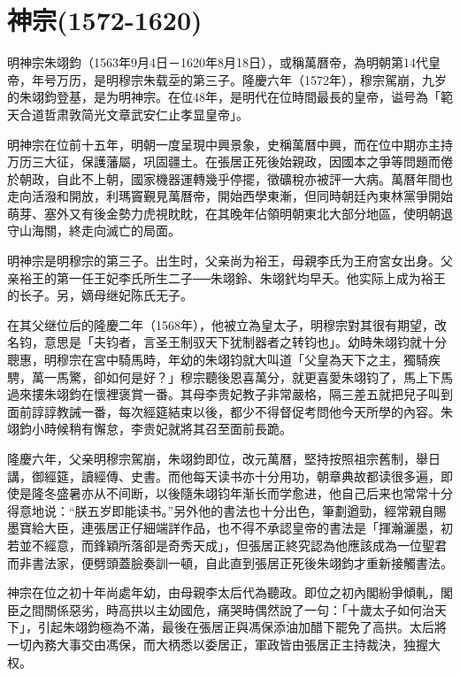 
\section{神宗\tiny(1572-1620)}

明神宗朱翊鈞（1563年9月4日－1620年8月18日），或稱萬曆帝，為明朝第14代皇帝，年号万历，是明穆宗朱载坖的第三子。隆慶六年（1572年），穆宗駕崩，九岁的朱翊鈞登基，是为明神宗。在位48年，是明代在位時間最長的皇帝，谥号為「範天合道哲肃敦简光文章武安仁止孝显皇帝」。

明神宗在位前十五年，明朝一度呈現中興景象，史稱萬曆中興，而在位中期亦主持万历三大征，保護藩屬，巩固疆土。在張居正死後始親政，因國本之爭等問題而倦於朝政，自此不上朝，國家機器運轉幾乎停擺，徵礦稅亦被評一大病。萬曆年間也走向活潑和開放，利瑪竇覲見萬曆帝，開始西學東漸，但同時朝廷內東林黨爭開始萌芽、塞外又有後金勢力虎視眈眈，在其晚年佔領明朝東北大部分地區，使明朝退守山海關，終走向滅亡的局面。

明神宗是明穆宗的第三子。出生时，父亲尚为裕王，母親李氏为王府宮女出身。父亲裕王的第一任王妃李氏所生二子──朱翊鈴、朱翊釴均早夭。他实际上成为裕王的长子。另，嫡母继妃陈氏无子。

在其父继位后的隆慶二年（1568年），他被立為皇太子，明穆宗對其很有期望，改名钧，意思是「夫钧者，言圣王制驭天下犹制器者之转钧也」。幼時朱翊钧就十分聰惠，明穆宗在宮中騎馬時，年幼的朱翊钧就大叫道「父皇為天下之主，獨騎疾騁，萬一馬驚，卻如何是好？」穆宗聽後恩喜萬分，就更喜愛朱翊钧了，馬上下馬過來摟朱翊鈞在懷裡褒賞一番。其母李贵妃教子非常嚴格，隔三差五就把兒子叫到面前諄諄教誡一番，每次經筵結束以後，都少不得督促考問他今天所學的內容。朱翊鈞小時候稍有懈怠，李贵妃就將其召至面前長跪。

隆慶六年，父亲明穆宗駕崩，朱翊鈞即位，改元萬曆，堅持按照祖宗舊制，舉日講，御經筵，讀經傳、史書。而他每天读书亦十分用功，朝章典故都读很多遍，即使是隆冬盛暑亦从不间断，以後隨朱翊钧年渐长而学愈进，他自己后来也常常十分得意地说：“朕五岁即能读书。”另外他的書法也十分出色，筆劃遒勁，經常親自賜墨寶給大臣，連張居正仔細端詳作品，也不得不承認皇帝的書法是「揮瀚灑墨，初若並不經意，而鋒穎所落卻是奇秀天成」，但張居正終究認為他應該成為一位聖君而非書法家，便劈頭蓋臉奏訓一頓，自此直到張居正死後朱翊鈞才重新接觸書法。

神宗在位之初十年尚處年幼，由母親李太后代為聽政。即位之初內閣紛爭傾軋，閣臣之間關係惡劣，時高拱以主幼國危，痛哭時偶然說了一句：「十歲太子如何治天下」，引起朱翊鈞極為不滿，最後在張居正與馮保添油加醋下罷免了高拱。太后將一切內務大事交由馮保，而大柄悉以委居正，軍政皆由張居正主持裁決，独握大权。

